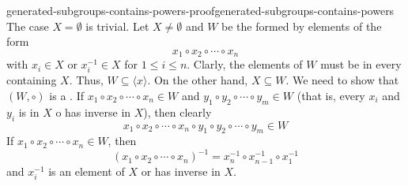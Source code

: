 \documentclass[preview]{standalone}
\begin{document}
\begin{snippetproof}{generated-subgroups-contains-powers-proof}{generated-subgroups-contains-powers}{}
    The case \(X=\emptyset\) is trivial.
    Let \(X \neq \emptyset\) and \(W\) be the \set formed by elements of the form
    \[
        x_1 \circ x_2 \circ \cdots \circ x_n
    \]
    with \(x_i \in X\) or \(x_i^{-1} \in X\) for \(1 \leq i \leq n\).
    Clarly, the elements of \(W\) must be in every \subgroup[subgroups] containing \(X\).
    Thus, \(W \subseteq \langle x \rangle\).
    On the other hand, \(X \subseteq W\).
    We need to show that \((W, \circ)\) is a \subgroup.
    If \(x_1 \circ x_2 \circ \cdots \circ x_n \in W\) and
    \(y_1 \circ y_2 \circ \cdots \circ y_m \in W\) (that is, every \(x_i\) and \(y_i\)
    is in \(X\) o has inverse in \(X\)), then clearly
    \[
        x_1 \circ x_2 \circ \cdots \circ x_n
        \circ
        y_1 \circ y_2 \circ \cdots \circ y_m
        \in W
    \]
    If \(x_1 \circ x_2 \circ \cdots \circ x_n \in W\), then\[
        {(x_1 \circ x_2 \circ \cdots \circ x_n)}^{-1}
        = x_n^{-1} \circ x_{n-1}^{-1} \circ x_1^{-1}
    \]
    and \(x_i^{-1}\) is an element of \(X\)
    or has inverse in \(X\).
\end{snippetproof}
\end{document}
